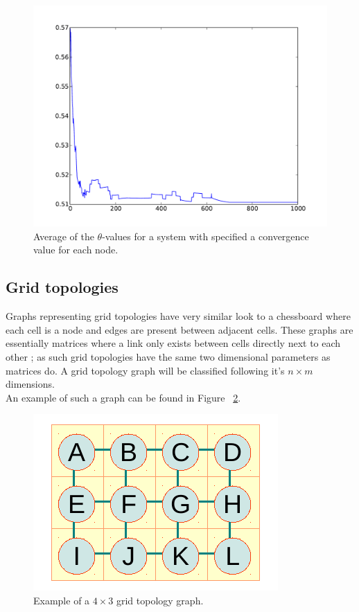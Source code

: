\documentclass[letterpaper]{article}
\begin{document}
\begin{figure}[h]
\centering
\includegraphics[scale=0.4]{./Figures/phase_avg.pdf}
\caption{Average of the $\theta$-values for a system with specified a convergence value for each node.} \label{fig:AvgDynConv}
\end{figure}


\subsection{Grid topologies}
\label{subsec:gridtopology}
Graphs representing grid topologies have very similar look to a chessboard where each cell is a node and edges are present between adjacent cells. These graphs are essentially matrices where a link only exists between cells directly next to each other ; as such grid topologies have the same two dimensional parameters as matrices do. A grid topology graph will be classified following it's $n\times m$ dimensions.\\

An example of such a graph can be found in Figure ~\ref{fig:GridExample}.

\begin{figure}[h]
\centering
\includegraphics[]{./Figures/GridTopologyExample.pdf}
\caption{Example of a $4\times 3$ grid topology graph.} \label{fig:GridExample}
\end{figure}
\end{document}
